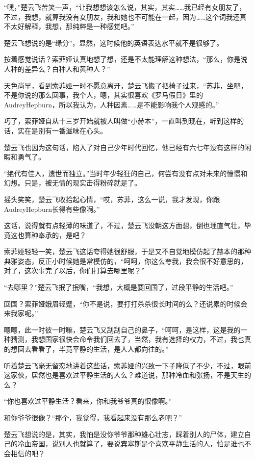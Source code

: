 “嘿，”楚云飞苦笑一声，“让我想想该怎么说，其实，其实……我已经有女朋友了，不过，我想，就算我没有女朋友，我和她也不可能在一起，因为……这个词我还真不太好解释，我想，那纯粹是一种感觉吧。”

楚云飞想说的是“缘分”，显然，这时候他的英语表达水平就不是很够了。

按着感觉说话？索菲娅认真地想了想，还是不太能理解这种想法，“那么，你是说人种的差异么？白种人和黄种人？”

天色尚早，看到索菲娅一时不愿意离开，楚云飞搬了把椅子过来，“苏菲，坐吧，不是你说的那么回事，我个人，嗯，其实很喜欢《罗马假日》里的AudreyHepburn，所以我认为，人种因素……是不能影响我个人观感的。”

巧了，索菲娅自从十三岁开始就被人叫做“小赫本”，一直叫到现在，听到这样的话，实在是别有一番滋味在心头。

楚云飞也因为这句话，陷入了对自己少年时代回忆，他已经有六七年没有这样的闲暇和勇气了。

“绝代有佳人，遗世而独立。”当时年少轻狂的自己，何尝有没有点对未来的憧憬和幻想。只是，被无情的现实击得粉碎就是了。

摇头笑笑，楚云飞收拾起心情，“哎，苏菲，这么一说，我才发现，你跟AudreyHepburn长得有些像啊。”

这话，说得就有点轻薄的味道了，不过，楚云飞没朝这方面想，倒也理直气壮，毕竟这也算种奉承的，是吧？

索菲娅轻轻一笑，楚云飞这话夸得她很舒服，于是又不自觉地模仿起了赫本的那种典雅姿态，反正小时候她是常模仿的，“呵呵，你这么夸我，我会很不好意思的，对了，这次事完了以后，你们打算去哪里呢？”

“去哪里？”楚云飞抿了抿嘴，“我想，大概是要回国了，过段平静的生活吧。”

回国？索菲娅娥眉轻蹙，“你不是说，要打打杀杀很长时间的么？还说累的时候会来我家呢。”

嗯嗯，此一时彼一时嘛，楚云飞又刮刮自己的鼻子，“呵呵，是这样，这是我的一种猜测，我想国家很快会命令我们回去了，当然，我有选择的权力，不过，我也真的想回去看看了，毕竟平静的生活，是人人都向往的。”

听着楚云飞毫无留恋地讲着这些话，索菲娅的兴致一下子降低了不少，不过，眼前这家伙，居然也是喜欢过平静生活的人么？难道说，那种冷血和张扬，不是天生的么？

“你也喜欢过平静生活？看来，你和我爷爷真的很像啊。”

和你爷爷很像？“那个，我觉得，我看起来没有那么老吧？”

楚云飞想说的是，其实，我怕是没你爷爷那种雄心壮志，踩着别人的尸体，建立自己的冷血帝国，说别人也就算了，要说宾塞斯是个喜欢平静生活的人，怕是谁也不会相信的吧？

